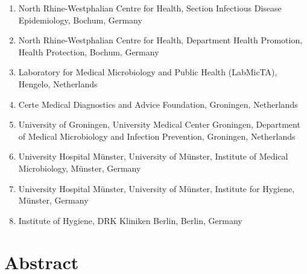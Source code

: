 \documentclass[
]{book}
\providecommand{\tightlist}{%
  \setlength{\itemsep}{0pt}\setlength{\parskip}{0pt}}
\begin{document}
\begin{enumerate}
\def\labelenumi{\arabic{enumi}.}
\tightlist
\item
  North Rhine-Westphalian Centre for Health, Section Infectious Disease Epidemiology, Bochum, Germany
\item
  North Rhine-Westphalian Centre for Health, Department Health Promotion, Health Protection, Bochum, Germany
\item
  Laboratory for Medical Microbiology and Public Health (LabMicTA), Hengelo, Netherlands
\item
  Certe Medical Diagnostics and Advice Foundation, Groningen, Netherlands
\item
  University of Groningen, University Medical Center Groningen, Department of Medical Microbiology and Infection Prevention, Groningen, Netherlands
\item
  University Hospital Münster, University of Münster, Institute of Medical Microbiology, Münster, Germany
\item
  University Hospital Münster, University of Münster, Institute for Hygiene, Münster, Germany
\item
  Institute of Hygiene, DRK Kliniken Berlin, Berlin, Germany
\end{enumerate}

\hypertarget{abstract-7}{%
\section*{Abstract}\label{abstract-7}}
\end{document}
